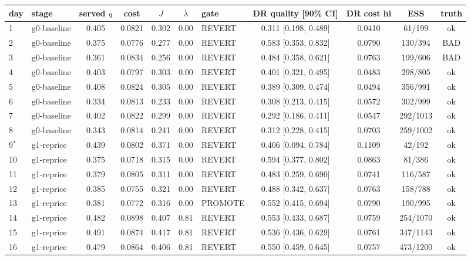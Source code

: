 \begin{tabular}{llcccclccc c}
\toprule
day & stage & served $q$ & cost & $J$ & $\bar\lambda$ & gate & DR quality [90\% CI] & DR cost hi & ESS & truth \\
\midrule
1 & g0-baseline & 0.405 & 0.0821 & 0.302 & 0.00 & REVERT & 0.311 [0.198, 0.489] & 0.0410 & 61/199 & ok \\
2 & g0-baseline & 0.375 & 0.0776 & 0.277 & 0.00 & REVERT & 0.583 [0.353, 0.832] & 0.0790 & 130/394 & BAD \\
3 & g0-baseline & 0.361 & 0.0834 & 0.256 & 0.00 & REVERT & 0.484 [0.358, 0.621] & 0.0763 & 199/606 & BAD \\
4 & g0-baseline & 0.403 & 0.0797 & 0.303 & 0.00 & REVERT & 0.401 [0.321, 0.495] & 0.0483 & 298/805 & ok \\
5 & g0-baseline & 0.408 & 0.0824 & 0.305 & 0.00 & REVERT & 0.389 [0.309, 0.474] & 0.0494 & 356/991 & ok \\
6 & g0-baseline & 0.334 & 0.0813 & 0.233 & 0.00 & REVERT & 0.308 [0.213, 0.415] & 0.0572 & 302/999 & ok \\
7 & g0-baseline & 0.402 & 0.0822 & 0.299 & 0.00 & REVERT & 0.292 [0.186, 0.411] & 0.0547 & 292/1013 & ok \\
8 & g0-baseline & 0.343 & 0.0814 & 0.241 & 0.00 & REVERT & 0.312 [0.228, 0.415] & 0.0703 & 259/1002 & ok \\
9$^*$ & g1-reprice & 0.439 & 0.0802 & 0.371 & 0.00 & REVERT & 0.406 [0.094, 0.784] & 0.1109 & 42/192 & ok \\
10 & g1-reprice & 0.375 & 0.0718 & 0.315 & 0.00 & REVERT & 0.594 [0.377, 0.802] & 0.0863 & 81/386 & ok \\
11 & g1-reprice & 0.379 & 0.0805 & 0.311 & 0.00 & REVERT & 0.483 [0.259, 0.690] & 0.0741 & 116/587 & ok \\
12 & g1-reprice & 0.385 & 0.0755 & 0.321 & 0.00 & REVERT & 0.488 [0.342, 0.637] & 0.0763 & 158/788 & ok \\
13 & g1-reprice & 0.381 & 0.0772 & 0.316 & 0.00 & PROMOTE & 0.552 [0.415, 0.694] & 0.0790 & 190/995 & ok \\
14 & g1-reprice & 0.482 & 0.0898 & 0.407 & 0.81 & REVERT & 0.553 [0.433, 0.687] & 0.0759 & 254/1070 & ok \\
15 & g1-reprice & 0.491 & 0.0874 & 0.417 & 0.81 & REVERT & 0.536 [0.436, 0.629] & 0.0761 & 347/1143 & ok \\
16 & g1-reprice & 0.479 & 0.0864 & 0.406 & 0.81 & REVERT & 0.550 [0.459, 0.645] & 0.0757 & 473/1200 & ok \\

\end{tabular}
